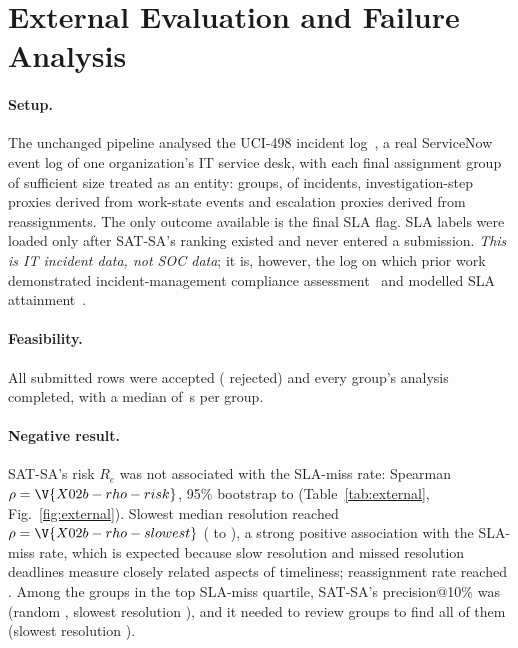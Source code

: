 \section{External Evaluation and Failure Analysis}
\label{sec:external}

\paragraph{Setup.} The unchanged pipeline analysed the UCI-498 incident
log~\cite{amaral2018uci498}, a real ServiceNow event log of one organization's IT
service desk, with each final assignment group of sufficient size treated as an
entity:  groups,  of 
incidents,  investigation-step proxies derived from work-state events
and  escalation proxies derived from reassignments. The only outcome
available is the final SLA flag. SLA labels were loaded only after SAT-SA's ranking
existed and never entered a submission. \emph{This is IT incident data, not SOC data};
it is, however, the log on which prior work demonstrated incident-management
compliance assessment~\cite{palma2024eurova} and modelled SLA
attainment~\cite{swain2022sla}.

\paragraph{Feasibility.} All  submitted rows were accepted
( rejected) and every group's analysis completed, with a median
of \,s per group.

\paragraph{Negative result.} SAT-SA's risk $R_e$ was not associated with the SLA-miss
rate: Spearman $\rho=\V{X02b-rho-risk}$, 95\% bootstrap  to
 (Table~\ref{tab:external}, Fig.~\ref{fig:external}). Slowest median
resolution reached $\rho=\V{X02b-rho-slowest}$ ( to
), a strong positive association with the SLA-miss rate,
which is expected because slow resolution and missed resolution deadlines measure
closely related aspects of timeliness; reassignment rate
reached . Among the  groups in the top SLA-miss
quartile, SAT-SA's precision@10\% was  (random ,
slowest resolution ), and it needed to review 
groups to find all of them (slowest resolution ).

